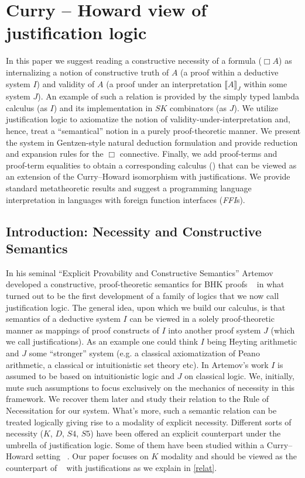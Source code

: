 \chapter{Curry -- Howard view of justification logic}
\label{proposal}
In this paper we suggest reading a constructive necessity  of a formula ($\Box A$) as  internalizing a notion of constructive truth of $A$ 
(a proof within a deductive system $I$) and validity of $A$
(a proof under an interpretation  $\llbracket A \rrbracket_J$ within some system $J$).  An example of such a relation is provided by the simply typed lambda calculus
(as $I$) and its implementation in $SK$ combinators (as $J$). We utilize justification logic to axiomatize the notion of 
validity-under-interpretation and, hence, treat  a  ``semantical'' notion in a purely proof-theoretic manner. We present the system  in 
Gentzen-style  natural deduction formulation  and provide reduction and expansion rules for the $\Box$ connective. Finally, we add proof-terms and proof-term equalities
to obtain a corresponding calculus ({}) that can be viewed as an extension of the Curry--Howard isomorphism with justifications.
We provide standard metatheoretic results  and suggest a 
programming language  interpretation in  languages with foreign function interfaces (\textit{FFI}s).

\section{Introduction: Necessity and Constructive Semantics}
In his seminal ``Explicit Provability and Constructive Semantics'' \cite{Artemov2001} Artemov developed a constructive, proof-theoretic semantics for 
\acs{BHK} proofs ~\cite{Troelstra1988} 
in what turned out to be the first development of a family of logics that we now call justification logic.
The general idea, upon which we build our calculus, is that semantics of a deductive system $I$ can be viewed in a solely proof-theoretic manner 
as mappings of proof constructs of $I$ into another proof system $J$ (which we call justifications).
As an example one could think  $I$  being  Heyting arithmetic and $J$ some  ``stronger'' system 
(e.g. a classical axiomatization of Peano arithmetic, a classical or intuitionistic set theory etc). 
 In Artemov's work $I$ is assumed to be
based on intuitionistic logic and $J$  on classical logic. 
We, initially,  mute such assumptions to focus exclusively on the mechanics of necessity in this framework.
We recover them later and study  their relation  to  the Rule of Necessitation for our system.
What's more,  such a semantic relation can be treated logically giving  rise to a modality of explicit necessity. Different sorts of necessity
($K$, $D$, $S4$, $S5$) have been offered  an explicit counterpart under the umbrella of justification logic. Some of them have been studied within a
Curry--Howard setting ~\cite{ArtBon07LFCS}. Our paper
focuses on  $K$ modality and  should be viewed as the  counterpart of ~\cite{Bellin2001} with justifications as we explain in \ref{relat}.

